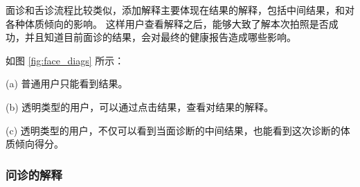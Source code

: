 面诊和舌诊流程比较类似，添加解释主要体现在结果的解释，包括中间结果，和对各种体质倾向的影响。
这样用户查看解释之后，能够大致了解本次拍照是否成功，并且知道目前面诊的结果，会对最终的健康报告造成哪些影响。

如图 \ref{fig:face_diags} 所示：

(a) 普通用户只能看到结果。

(b) 透明类型的用户，可以通过点击结果，查看对结果的解释。

(c) 透明类型的用户，不仅可以看到当面诊断的中间结果，也能看到这次诊断的体质倾向得分。



\subsubsection{问诊的解释}

